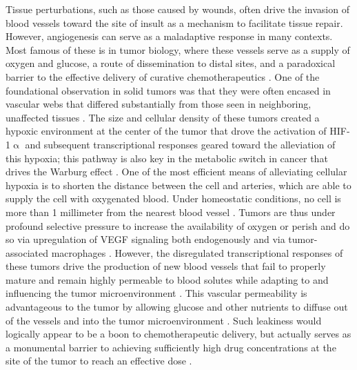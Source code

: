 Tissue perturbations, such as those caused by wounds, often drive the invasion of blood vessels toward the site of insult as a mechanism to facilitate tissue repair. However, angiogenesis can serve as a maladaptive response in many contexts. Most famous of these is in tumor biology, where these vessels serve as a supply of oxygen and glucose, a route of dissemination to distal sites, and a paradoxical barrier to the effective delivery of curative chemotherapeutics \citep{Park2016, Yonucu2017, Fujita2017}. One of the foundational observation in solid tumors was that they were often encased in vascular webs that differed substantially from those seen in neighboring, unaffected tissues \citep{Chung2011}. The size and cellular density of these tumors created a hypoxic environment at the center of the tumor that drove the activation of HIF\hyp{}1$\upalpha$ and subsequent transcriptional responses geared toward the alleviation of this hypoxia; this pathway is also key in the metabolic switch in cancer that drives the Warburg effect \citep{Mesange2014, Masoud2015, Courtnay2015}. One of the most efficient means of alleviating cellular hypoxia is to shorten the distance between the cell and arteries, which are able to supply the cell with oxygenated blood. Under homeostatic conditions, no cell is more than 1 millimeter from the nearest blood vessel \citep{Weber2020}. Tumors are thus under profound selective pressure to increase the availability of oxygen or perish and do so via upregulation of VEGF signaling both endogenously and via tumor\hyp{}associated macrophages \citep{Napione2017, Riabov2014}. However, the disregulated transcriptional responses of these tumors drive the production of new blood vessels that fail to properly mature and remain highly permeable to blood solutes while adapting to and influencing the tumor microenvironment \citep{Qian2009, Carlson2021}. This vascular permeability is advantageous to the tumor by allowing glucose and other nutrients to diffuse out of the vessels and into the tumor microenvironment \citep{Park2016}. Such leakiness would logically appear to be a boon to chemotherapeutic delivery, but actually serves as a monumental barrier to achieving sufficiently high drug concentrations at the site of the tumor to reach an effective dose \citep{Datta2015, Goel2012, Yonucu2017}. 

